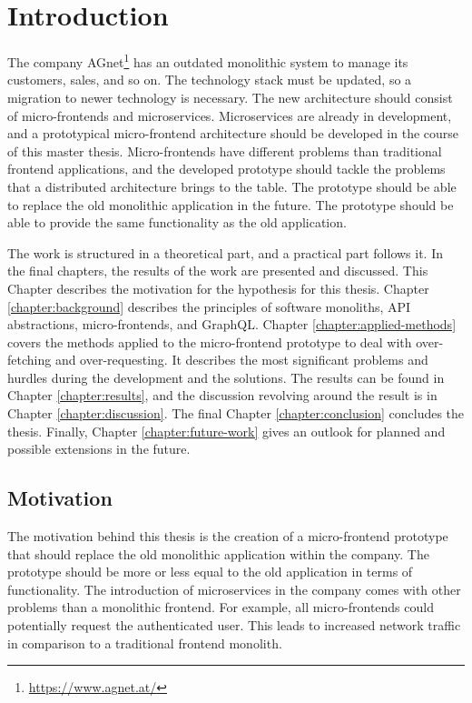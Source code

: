 \chapter{Introduction}\label{chapter:introduction}

The company AGnet\footnote{\url{https://www.agnet.at/}} has an outdated monolithic system to manage its customers, sales, and so on. The technology stack must be updated, so a migration to newer technology is necessary. The new architecture should consist of micro-frontends and microservices. Microservices are already in development, and a prototypical micro-frontend architecture should be developed in the course of this master thesis. Micro-frontends have different problems than traditional frontend applications, and the developed prototype should tackle the problems that a distributed architecture brings to the table. The prototype should be able to replace the old monolithic application in the future. The prototype should be able to provide the same functionality as the old application.


\bigskip

\noindent The work is structured in a theoretical part, and a practical part follows it. In the final chapters, the results of the work are presented and discussed. This Chapter describes the motivation for the hypothesis for this thesis. Chapter \ref{chapter:background} describes the principles of software monoliths, \ac{API} abstractions, micro-frontends, and GraphQL. Chapter \ref{chapter:applied-methods} covers the methods applied to the micro-frontend prototype to deal with over-fetching and over-requesting. It describes the most significant problems and hurdles during the development and the solutions. The results can be found in Chapter \ref{chapter:results}, and the discussion revolving around the result is in Chapter \ref{chapter:discussion}. The final Chapter \ref{chapter:conclusion} concludes the thesis. Finally, Chapter \ref{chapter:future-work} gives an outlook for planned and possible extensions in the future.

\section{Motivation}\label{section:introduction:motivation}

The motivation behind this thesis is the creation of a micro-frontend prototype that should replace the old monolithic application within the company. The prototype should be more or less equal to the old application in terms of functionality. The introduction of microservices in the company comes with other problems than a monolithic frontend. For example, all micro-frontends could potentially request the authenticated user. This leads to increased network traffic in comparison to a traditional frontend monolith.

